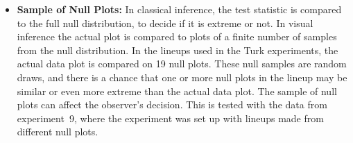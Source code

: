 \documentclass[10pt]{article}\usepackage[]{graphicx}\usepackage[]{color}
\begin{document}
\begin{itemize}



\item{\bf Sample of Null Plots:} In classical inference, the test statistic is compared to the full null distribution, to decide if it is extreme or not. In visual inference the actual plot is compared to plots of a finite number of samples from the null distribution. In the lineups used in the Turk experiments, the actual data plot is compared on 19 null plots. These null samples are random draws, and there is a chance that one or more null plots in the lineup may be similar or even more extreme than the actual data plot. The sample of null plots can affect the observer's decision. This is tested with the data from experiment~9, where the experiment was set up with lineups made from different null plots.



\end{itemize}
\end{document}
